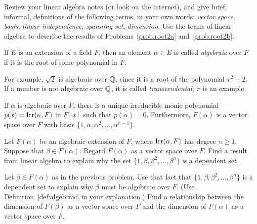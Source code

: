 \begin{problem}
    Review your linear algebra notes (or look on the internet), and give brief, informal, definitions of the following terms, in your own words: \textit{vector space}, \textit{basis}, \textit{linear independence}, \textit{spanning set}, \textit{dimension}. Use the terms of linear algebra to describe the results of Problems~\ref{prob:root2a} and~\ref{prob:root2b}.
\end{problem}

\begin{definition}\label{def:algebraic}
If $E$ is an extension of a field $F$, then an element $\alpha \in E$ is called \emph{algebraic} over $F$ if it is the root of some polynomial in $F$.
\end{definition}

For example, $\sqrt{2}$ is algebraic over $\mathbb{Q}$, since it is a root of the polynomial $x^2-2$. If a number is not algebraic over $\mathbb{Q}$, it is called \textit{transcendental}; $\pi$ is an example.

\begin{theorem}
    If $\alpha$ is algebraic over $F$, there is a unique irreducible monic polynomial $p(x) = \operatorname{Irr}(\alpha, F)$ in $F[x]$ such that $p(\alpha)=0$.  Furthermore, $F(\alpha)$ is a vector space over $F$ with basis $\{1, \alpha, \alpha^2, \ldots, \alpha^{n-1}\}$.
    \label{thm:aet}
\end{theorem}

\begin{problem}
Let $F(\alpha)$ be an algebraic extension of $F$, where $\operatorname{Irr}(\alpha, F)$ has degree $n\geq 1$.  Suppose that $\beta \in F(\alpha)$.  Regard $F(\alpha)$ as a vector space over $F$. Find a result from linear algebra to explain why the set $\{1, \beta, \beta^2, \ldots, \beta^n\}$ is a dependent set.
\end{problem}



\begin{problem}
Let $\beta \in F(\alpha)$ as in the previous problem.
Use that fact that $\{1, \beta, \beta^2, \ldots, \beta^n\}$ is a dependent set to explain why $\beta$ must be algebraic over $F$. (Use Definition~\ref{def:algebraic} in your explanation.) Find a relationship between the dimension of $F(\beta)$ as a vector space over $F$ and the dimension of $F(\alpha)$ as a vector space over $F$.
\end{problem}



